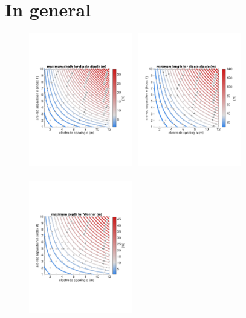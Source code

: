 \documentclass[a4paper,12pt]{article}
\begin{document}
\section{In general}
%
%
\begin{figure}[!h]
\centering
\includegraphics[trim={20 170 30 180},clip,width=0.4\textwidth]{../pics/depth-dipole.pdf}~
\includegraphics[trim={20 170 30 180},clip,width=0.4\textwidth]{../pics/min-length-dipole.pdf}\\~\\
\includegraphics[trim={20 170 30 180},clip,width=0.4\textwidth]{../pics/depth-wenner.pdf}~

\end{figure}
\end{document}
